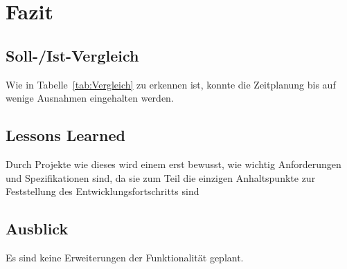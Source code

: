 \section{Fazit} 
\label{sec:Fazit}

\subsection{Soll-/Ist-Vergleich}
\label{sec:SollIstVergleich}

Wie in Tabelle~\ref{tab:Vergleich} zu erkennen ist, konnte die Zeitplanung bis auf wenige Ausnahmen eingehalten werden.


\subsection{Lessons Learned}
\label{sec:LessonsLearned}

Durch Projekte wie dieses wird einem erst bewusst, wie wichtig Anforderungen und Spezifikationen sind, da sie zum Teil die einzigen Anhaltspunkte zur Feststellung des Entwicklungsfortschritts sind

\subsection{Ausblick}
\label{sec:Ausblick}

Es sind keine Erweiterungen der Funktionalität geplant.
